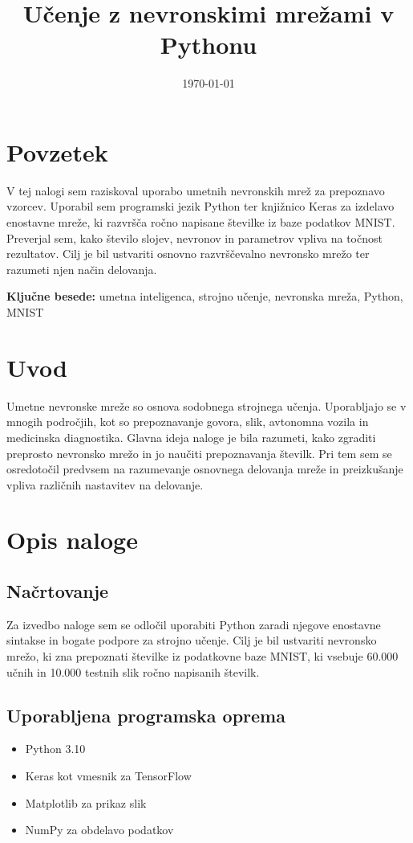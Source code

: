 \documentclass[a4paper,12pt]{article}
\title{Učenje z nevronskimi mrežami v Pythonu}
\author{}
\date{\today}
\begin{document}
\maketitle

\section*{Povzetek}
V tej nalogi sem raziskoval uporabo umetnih nevronskih mrež za prepoznavo vzorcev. Uporabil sem programski jezik Python ter knjižnico Keras za izdelavo enostavne mreže, ki razvršča ročno napisane številke iz baze podatkov MNIST. Preverjal sem, kako število slojev, nevronov in parametrov vpliva na točnost rezultatov. Cilj je bil ustvariti osnovno razvrščevalno nevronsko mrežo ter razumeti njen način delovanja.

\textbf{Ključne besede:} umetna inteligenca, strojno učenje, nevronska mreža, Python, MNIST

\section*{Uvod}
Umetne nevronske mreže so osnova sodobnega strojnega učenja. Uporabljajo se v mnogih področjih, kot so prepoznavanje govora, slik, avtonomna vozila in medicinska diagnostika. Glavna ideja naloge je bila razumeti, kako zgraditi preprosto nevronsko mrežo in jo naučiti prepoznavanja številk. Pri tem sem se osredotočil predvsem na razumevanje osnovnega delovanja mreže in preizkušanje vpliva različnih nastavitev na delovanje.

\section*{Opis naloge}

\subsection*{Načrtovanje}
Za izvedbo naloge sem se odločil uporabiti Python zaradi njegove enostavne sintakse in bogate podpore za strojno učenje. Cilj je bil ustvariti nevronsko mrežo, ki zna prepoznati številke iz podatkovne baze MNIST, ki vsebuje 60.000 učnih in 10.000 testnih slik ročno napisanih številk.

\subsection*{Uporabljena programska oprema}
\begin{itemize}
  \item Python 3.10
  \item Keras kot vmesnik za TensorFlow
  \item Matplotlib za prikaz slik
  \item NumPy za obdelavo podatkov
\end{itemize}
\end{document}
